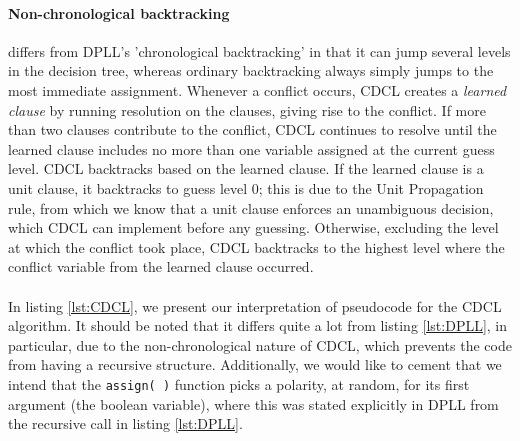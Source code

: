 \paragraph{Non-chronological backtracking} differs from DPLL's 'chronological backtracking' in that it can jump several levels in the decision tree, whereas ordinary backtracking always simply jumps to the most immediate assignment. Whenever a conflict occurs, CDCL creates a \emph{learned clause} by running resolution on the clauses, giving rise to the conflict. If more than two clauses contribute to the conflict, CDCL continues to resolve until the learned clause includes no more than one variable assigned at the current guess level. CDCL backtracks based on the learned clause. If the learned clause is a unit clause, it backtracks to guess level \(0\); this is due to the Unit Propagation rule, from which we know that a unit clause enforces an unambiguous decision, which CDCL can implement before any guessing. Otherwise, excluding the level at which the conflict took place, CDCL backtracks to the highest level where the conflict variable from the learned clause occurred.
\\
\\
In listing \ref{lst:CDCL}, we present our interpretation of pseudocode for the CDCL algorithm. It should be noted that it differs quite a lot from listing \ref{lst:DPLL}, in particular, due to the non-chronological nature of CDCL, which prevents the code from having a recursive structure. Additionally, we would like to cement that we intend that the \texttt{assign( )} function picks a polarity, at random, for its first argument (the boolean variable), where this was stated explicitly in DPLL from the recursive call in listing \ref{lst:DPLL}. 

